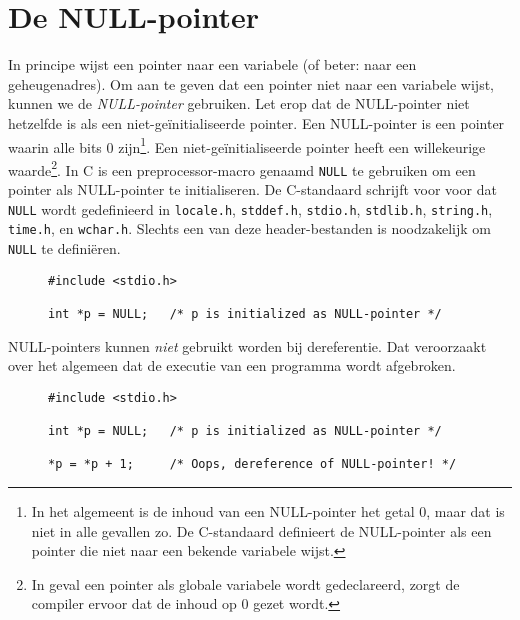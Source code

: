 \section{De NULL-pointer}
\label{sec:nullpointer}
In principe wijst een pointer naar een variabele (of beter: naar een geheugenadres). Om aan te geven dat een pointer niet naar een variabele wijst, kunnen we de \textsl{NULL-pointer} gebruiken. Let erop dat de NULL-pointer niet hetzelfde is als een niet-geïnitialiseerde pointer. Een NULL-pointer is een pointer waarin alle bits 0 zijn\footnote{In het algemeent is de inhoud van een NULL-pointer het getal 0, maar dat is niet in alle gevallen zo. De C-standaard definieert de NULL-pointer als een pointer die niet naar een bekende variabele wijst.}. Een niet-geïnitialiseerde pointer heeft een willekeurige waarde\footnote{In geval een pointer als globale variabele wordt gedeclareerd, zorgt de compiler ervoor dat de inhoud op 0 gezet wordt.}. In C is een preprocessor-macro genaamd \texttt{NULL} te gebruiken om een pointer als NULL-pointer te initialiseren. De C-standaard schrijft voor voor dat \texttt{NULL} wordt gedefinieerd in \texttt{locale.h}, \texttt{stddef.h}, \texttt{stdio.h}, \texttt{stdlib.h}, \texttt{string.h}, \texttt{time.h}, en \texttt{wchar.h}. Slechts een van deze header-bestanden is noodzakelijk om \texttt{NULL} te definiëren.

\begin{figure}[!ht]
\begin{lstlisting}[caption=Declaratie en initialisatie van een NULL-pointer.]
#include <stdio.h>

int *p = NULL;   /* p is initialized as NULL-pointer */
\end{lstlisting}
\end{figure}

NULL-pointers kunnen \textsl{niet} gebruikt worden bij dereferentie. Dat veroorzaakt over het algemeen dat de executie van een programma wordt afgebroken.

\begin{figure}[!ht]
\begin{lstlisting}[caption=Dereferentie van een NULL-pointer.]
#include <stdio.h>

int *p = NULL;   /* p is initialized as NULL-pointer */

*p = *p + 1;     /* Oops, dereference of NULL-pointer! */
\end{lstlisting}
\end{figure}

